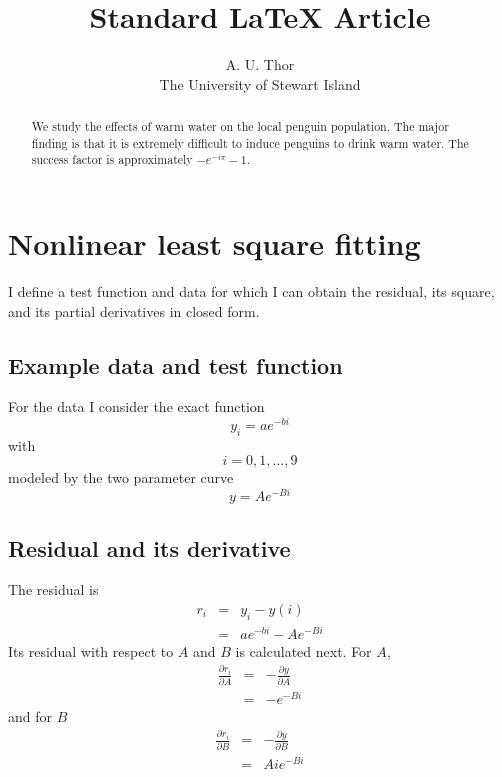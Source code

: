 \documentclass{article}
\begin{document}
\title{Standard 
\LaTeX{}
Article}
\author{A. U. Thor \\
The University of Stewart Island}
\maketitle

\begin{abstract}
We study the effects of warm water on the local penguin population. The
major finding is that it is extremely difficult to induce penguins to drink
warm water. The success factor is approximately $-e^{-i\pi }-1$.
\end{abstract}

\section{Nonlinear least square fitting}

I define a test function and data for which I can obtain the residual, its
square, and its partial derivatives in closed form.

\subsection{Example data and test function}

For the data I consider the exact function 
\begin{equation}
y_{i}=ae^{-bi}  \label{def:y_i}
\end{equation}%
with 
\begin{equation}
i=0,1,\ldots ,9  \label{def:i:0-9}
\end{equation}%
modeled by the two parameter curve%
\begin{equation}
y=Ae^{-Bi}  \label{def:y(i)}
\end{equation}

\subsection{Residual and its derivative}

The residual is%
\begin{eqnarray}
r_{i} &=&y_{i}-y\left( i\right)  \\
&=&ae^{-bi}-Ae^{-Bi}  \label{eq:r_i^2}
\end{eqnarray}%
Its residual with respect to $A$ and $B$ is calculated next. For $A$,%
\begin{eqnarray}
\frac{\partial r_{i}}{\partial A} &=&-\frac{\partial y}{\partial A} \\
&=&-e^{-Bi}
\end{eqnarray}%
and for $B$%
\begin{eqnarray}
\frac{\partial r_{i}}{\partial B} &=&-\frac{\partial y}{\partial B} \\
&=&Aie^{-Bi}
\end{eqnarray}
\end{document}
